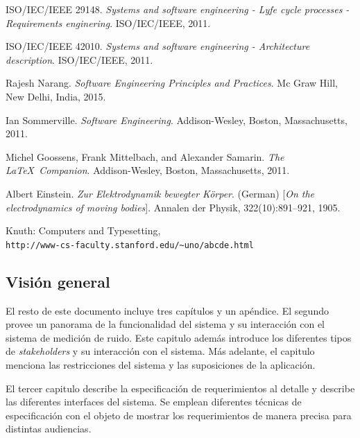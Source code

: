\documentclass[paper=letter,oneside,fontsize=12pt, parskip=full]{scrartcl}
\newcommand{\smr}{sistema de medición de ruido}
\begin{document}
	\begingroup
		\renewcommand{\section}[2]{}
		\begin{thebibliography}{9}
			ISO/IEC/IEEE 29148. 
			\textit{Systems and software engineering - Lyfe cycle processes - Requirements enginering}. 
			ISO/IEC/IEEE, 2011.
			
			ISO/IEC/IEEE 42010. 
			\textit{Systems and software engineering - Architecture description}. 
			ISO/IEC/IEEE, 2011.		
			
			Rajesh Narang. 
			\textit{Software Engineering Principles and Practices}. 
			Mc Graw Hill, New Delhi, India, 2015.			
			
			Ian Sommerville. 
			\textit{Software Engineering}. 
			Addison-Wesley, Boston, Massachusetts, 2011.					
			
			Michel Goossens, Frank Mittelbach, and Alexander Samarin. 
			\textit{The \LaTeX\ Companion}. 
			Addison-Wesley, Boston, Massachusetts, 2011.		
			
			Albert Einstein. 
			\textit{Zur Elektrodynamik bewegter K{\"o}rper}. (German) 
			[\textit{On the electrodynamics of moving bodies}]. 
			Annalen der Physik, 322(10):891–921, 1905.
			
			Knuth: Computers and Typesetting,
			\\\texttt{http://www-cs-faculty.stanford.edu/\~{}uno/abcde.html}
		\end{thebibliography}
	\endgroup

	
	\subsection{Visión general}
	
	El resto de este documento incluye tres capítulos y un apéndice. El segundo provee un panorama de la funcionalidad del sistema y su interacción con el \smr. Este capitulo además introduce los diferentes tipos de \emph{stakeholders} y su interacción con el sistema. Más adelante, el capitulo menciona las restricciones del sistema y las suposiciones de la aplicación.
	
	El tercer capitulo describe la especificación de requerimientos al detalle y describe las diferentes interfaces del sistema. Se emplean diferentes técnicas de especificación con el objeto de mostrar los requerimientos de manera precisa para distintas audiencias.
	
\end{document}

